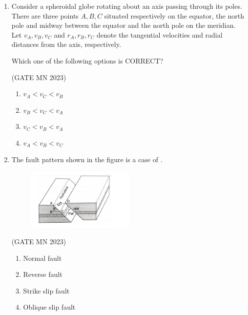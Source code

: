 \documentclass[journal]{IEEEtran}
\begin{document}
\begin{enumerate}
    \item Consider a spheroidal globe rotating about an axis passing through its poles. There are three points $A, B, C$ situated respectively on the equator, the north pole and midway between the equator and the north pole on the meridian. Let $v_A, v_B, v_C$ and $r_A, r_B, r_C$ denote the tangential velocities and radial distances from the axis, respectively. 
    
    Which one of the following options is CORRECT?
    

    \hfill(GATE MN 2023)
    \begin{multicols}{2}
    \begin{enumerate}
        \item $v_A < v_C < v_B$
        \item $v_B < v_C < v_A$
        \item $v_C < v_B < v_A$
        \item $v_A < v_B < v_C$
    \end{enumerate}
    \end{multicols}
    

    \item The fault pattern shown in the figure is a case of \underline{\hspace{2cm}}.
    
    \begin{figure}[H]
    \centering
\includegraphics[width=0.5\textwidth]{Screenshot_2025_0822_112131.png}
\caption{}
    \label{fig:Q11}
\end{figure}
    

    \hfill(GATE MN 2023)
    \begin{multicols}{2}
    \begin{enumerate}
        \item Normal fault
        \item Reverse fault
        \item Strike slip fault
        \item Oblique slip fault
    \end{enumerate}
    \end{multicols}
    

\end{enumerate}
\end{document}
